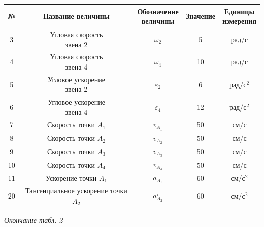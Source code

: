 \documentclass{article}
\begin{document}
\begin{tabular}{|c|c|c|c|c|}
  \hline
  \rule{0pt}{1cm} № & \hspace*{0.5cm} Название величины \hspace*{0.5cm} & \makecell{Обозначение\\ величины} & Значение & \makecell{Единицы\\ измерения} \\[0.5cm]
  \hline

  \rule{0pt}{1cm} 3  & \makecell{Угловая скорость\\звена 2} & $\omega_2$ & 5 & рад/с \\[0.5cm]
  \hline
  \rule{0pt}{1cm} 4  & \makecell{Угловая скорость\\звена 4} & $\omega_4$ & 10 & рад/с \\[0.5cm]
  \hline
  \rule{0pt}{1cm} 5  & \makecell{Угловое ускорение\\звена 2} & $\varepsilon_2$ & 6 & рад/с$^2$ \\[0.5cm]
  \hline
  \rule{0pt}{1cm} 6  & \makecell{Угловое ускорение\\звена 4} & $\varepsilon_4$ & 12 & рад/с$^2$ \\[0.5cm]
  \hline
  \rule{0pt}{1cm} 7  & \makecell{Скорость\\точки $A_1$} & $v_{A_1}$ & 50 & см/с \\[0.5cm]
  \hline
  \rule{0pt}{1cm} 8  & \makecell{Скорость\\точки $A_2$} & $v_{A_2}$ & 50 & см/с \\[0.5cm]
  \hline
  \rule{0pt}{1cm} 9  & \makecell{Скорость\\точки $A_3$} & $v_{A_3}$ & 50 & см/с \\[0.5cm]
  \hline
  \rule{0pt}{1cm} 10 & \makecell{Скорость\\точки $A_4$} & $v_{A_4}$ & 50 & см/с \\[0.5cm]
  \hline
  \rule{0pt}{1cm} 11 & \makecell{Ускорение\\точки $A_1$} & $a_{A_1}$ & 60 & см/с$^2$ \\[0.5cm]
  \hline
  \rule{0pt}{1cm} 20 & \makecell{Тангенциальное\\ускорение точки $A_2$} & $a_{A_2}^\tau$ & 60 & см/с$^2$ \\[0.5cm]
  \hline
  
\end{tabular}

\newpage

\begin{flushright}
  \small\textit{Окончание табл. 2} \hspace*{0.4cm}
\end{flushright}
\end{document}
